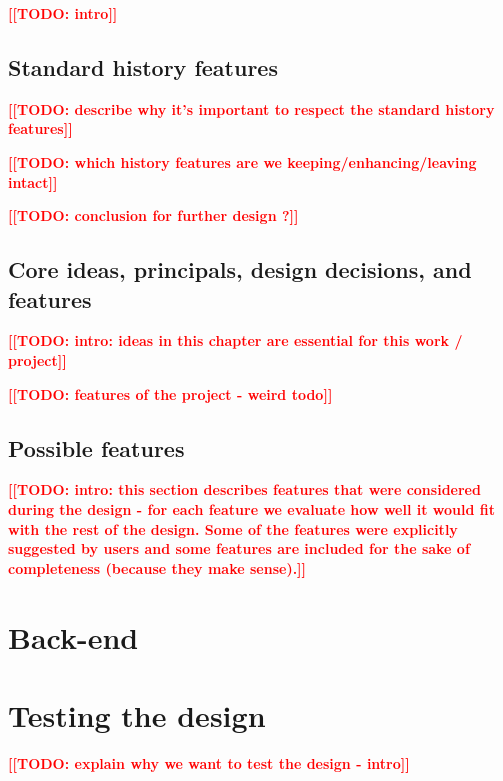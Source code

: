 \documentclass[thesis=M,english]{FITthesis}[2012/10/20]
\newcommand{\todotext}[1]{\textcolor{red}{\textbf{[[#1]]}}}
\newcommand{\blind}[1][1]{\textcolor{mygray}{\Blindtext[#1][1]}}
\begin{document}
\todotext{TODO: intro}

\blind

\subsection{Standard history features}

\todotext{TODO: describe why it's important to respect the standard history features}

\todotext{TODO: which history features are we keeping/enhancing/leaving intact}

\blind[3]

\todotext{TODO: conclusion for further design ?}



\subsection{Core ideas, principals, design decisions, and features}

\todotext{TODO: intro: ideas in this chapter are essential for this work / project}

\todotext{TODO: features of the project - weird todo}

\blind[3]

\subsection{Possible features}

\todotext{TODO: intro: this section describes features that were considered during the design - for each feature we evaluate how well it would fit with the rest of the design. Some of the features were explicitly suggested by users and some features are included for the sake of completeness (because they make sense).}



\section{Back-end}

\blind

\section{Testing the design}

\todotext{TODO: explain why we want to test the design - intro}
\end{document}
